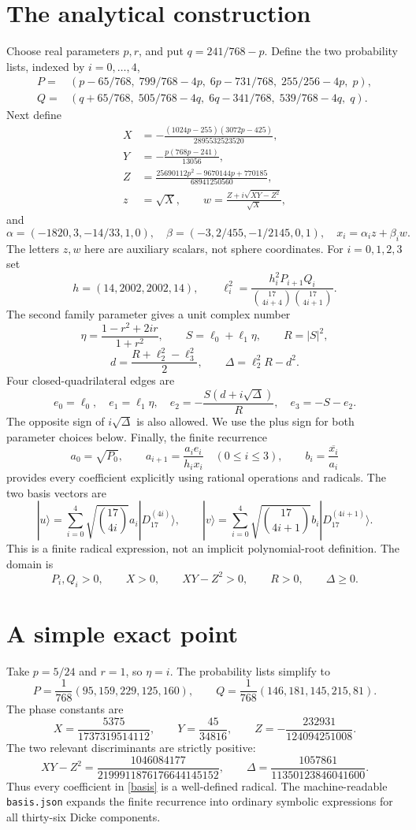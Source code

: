 \documentclass[11pt]{article}
\newcommand{\D}[1]{|D_{17}^{(#1)}\rangle}
\begin{document}
\section{The analytical construction}
Choose real parameters $p,r$, and put $q=241/768-p$. Define the two probability
lists, indexed by $i=0,\ldots,4$,
\begin{align*}
P={}&(p-65/768,\;799/768-4p,\;6p-731/768,\;255/256-4p,\;p),\\
Q={}&(q+65/768,\;505/768-4q,\;6q-341/768,\;539/768-4q,\;q).
\end{align*}
Next define
\begin{align*}
X&=-\frac{(1024p-255)(3072p-425)}{2895532523520},\\
Y&=-\frac{p(768p-241)}{13056},\\
Z&=\frac{25690112p^2-9670144p+770185}{68941250560},\\
z&=\sqrt X,\qquad w=\frac{Z+i\sqrt{XY-Z^2}}{\sqrt X},
\end{align*}
and
\[
\alpha=(-1820,3,-14/33,1,0),\quad
\beta=(-3,2/455,-1/2145,0,1),\quad x_i=\alpha_i z+\beta_i w.
\]
The letters $z,w$ here are auxiliary scalars, not sphere coordinates.
For $i=0,1,2,3$ set
\[
h=(14,2002,2002,14),\qquad
\ell_i^2=\frac{h_i^2P_{i+1}Q_i}{\binom{17}{4i+4}\binom{17}{4i+1}}.
\]
The second family parameter gives a unit complex number
\[
\eta=\frac{1-r^2+2ir}{1+r^2},\qquad
S=\ell_0+\ell_1\eta,\qquad R=|S|^2,
\]
\[
d=\frac{R+\ell_2^2-\ell_3^2}{2},\qquad
\Delta=\ell_2^2R-d^2.
\]
Four closed-quadrilateral edges are
\[
e_0=\ell_0,\quad e_1=\ell_1\eta,\quad
 e_2=-\frac{S(d+i\sqrt\Delta)}{R},\quad e_3=-S-e_2.
\]
The opposite sign of $i\sqrt\Delta$ is also allowed. We use the plus sign
for both parameter choices below.
Finally, the finite recurrence
\[
a_0=\sqrt{P_0},\qquad
a_{i+1}=\frac{a_i e_i}{h_i x_i}\quad(0\le i\le3),\qquad
b_i=\overline{\frac{x_i}{a_i}}
\]
provides every coefficient explicitly using rational operations and radicals.
The two basis vectors are
\begin{equation}\label{basis}
|u\rangle=\sum_{i=0}^4\sqrt{\binom{17}{4i}}a_i\D{4i},\qquad
|v\rangle=\sum_{i=0}^4\sqrt{\binom{17}{4i+1}}b_i\D{4i+1}.
\end{equation}
This is a finite radical expression, not an implicit polynomial-root definition.
The domain is
\[
P_i,Q_i>0,\qquad X>0,\qquad XY-Z^2>0,\qquad R>0,\qquad\Delta\ge0.
\]

\section{A simple exact point}
Take $p=5/24$ and $r=1$, so $\eta=i$. The probability lists simplify to
\[
P=\frac1{768}(95,159,229,125,160),\qquad
Q=\frac1{768}(146,181,145,215,81).
\]
The phase constants are
\[
X=\frac{5375}{1737319514112},\qquad
Y=\frac{45}{34816},\qquad Z=-\frac{232931}{124094251008}.
\]
The two relevant discriminants are strictly positive:
\[
XY-Z^2=\frac{1046084177}{2199911876176644145152},\qquad
\Delta=\frac{1057861}{11350123846041600}.
\]
Thus every coefficient in \eqref{basis} is a well-defined radical. The
machine-readable \texttt{basis.json} expands the finite recurrence into
ordinary symbolic expressions for all thirty-six Dicke components.
\end{document}
